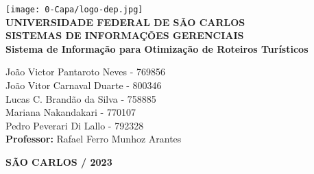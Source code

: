 \justifying %
\onehalfspacing %
\setlength{\parindent}{0cm}  %
\renewcommand*\familydefault{\rmdefault}
\thispagestyle{empty}
\begin{center}
\texttt{[image: 0-Capa/logo-dep.jpg]}\\
\vspace*{.8cm}
{\huge \textbf{UNIVERSIDADE FEDERAL DE SÃO CARLOS}}\\
\vspace*{.8cm}
{\Large \textbf{SISTEMAS DE INFORMAÇÕES GERENCIAIS}}\\
\vspace*{3cm}
{\Large \textbf{Sistema de Informação para Otimização de Roteiros Turísticos}}\\
\vspace*{4.5cm}
\begin{flushright}
    \onehalfspacing
    {\Large  João Victor Pantaroto Neves - 769856}\\
    {\Large  João Vitor Carnaval Duarte - 800346}\\
    {\Large  Lucas C. Brandão da Silva - 758885}\\
    {\Large  Mariana Nakandakari  - 770107}\\
    {\Large  Pedro Peverari Di Lallo  - 792328}\\
    \vspace*{.3cm}
    {\Large \textbf{Professor:}}
    {\Large Rafael Ferro Munhoz Arantes }\\
\end{flushright}
\vspace*{\fill}
{\large \bf SÃO CARLOS / 2023}
\end{center}